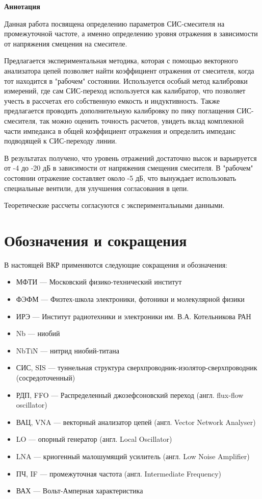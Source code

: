 \documentclass[a4paper]{article}
\begin{document}
\graphicspath{ {pictures/} }

\textbf{\Large{Аннотация}}

Данная работа посвящена определению параметров СИС-смесителя на промежуточной частоте, а именно определению уровня отражения в зависимости от напряжения смещения на смесителе. 
\par
Предлагается экспериментальная методика, которая с помощью векторного анализатора цепей позволяет найти коэффициент отражения от смесителя, когда тот находится в "рабочем" состоянии. Используется особый метод калибровки измерений, где сам СИС-переход используется как калибратор, что позволяет учесть в рассчетах его собственную емкость и индуктивность. Также предлагается проводить дополнительную калибровку по пику поглащения СИС-смесителя, так можно оценить точность расчетов, увидеть вклад комплекной части импеданса в общей коэффициент отражения и определить импеданс подводящей к СИС-переходу линии.
\par 
В результатах получено, что уровень отражений достаточно высок и варьируется от -4 до -20 дБ в зависимости от напряжения смещения смесителя. В "рабочем" состоянии отражение составляет около -5 дБ, что вынуждает использовать специальные вентили, для улучшения согласования в цепи.
\par
Теоретические рассчеты согласуются с экспериментальными данными.

\newpage
\tableofcontents
\newpage

\section{Обозначения и сокращения}

В настоящей ВКР применяются следующие сокращения и обозначения:

\begin{itemize}
    \item МФТИ	—	Московский физико-технический институт
    \item ФЭФМ	—	Физтех-школа электроники, фотоники и молекулярной физики
    \item ИРЭ	—	Институт радиотехники и электроники им. В.А. Котельникова РАН
    \item Nb	—	ниобий
    \item NbTiN	—	нитрид ниобий-титана
    \item СИС, SIS	—	туннельная структура сверхпроводник-изолятор-сверхпроводник (сосредоточенный) 
    \item РДП, FFO	—	Распределенный джозефсоновский переход (англ. flux-flow oscillator)
    \item ВАЦ, VNA — векторный анализатор цепей (англ. Vector Network Analyser)
    \item LO — опорный генератор (англ. Local Oscillator)
    \item LNA — криогенный малошумящий усилитель (англ. Low Noise Amplifier)
    \item ПЧ, IF — промежуточная частота (англ. Intermediate Frequency)
    \item ВАХ — Вольт-Амперная характеристика
\end{itemize}
\newpage
\end{document}
